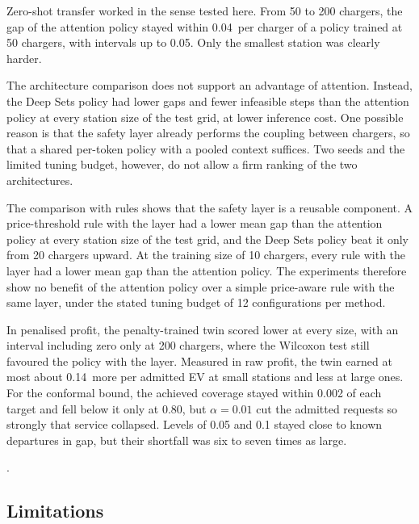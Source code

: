 Zero-shot transfer worked in the sense tested here.
From 50 to 200 chargers, the gap of the attention policy stayed within 0.04\,\texteuro{} per charger of a policy trained at 50 chargers, with intervals up to 0.05.
Only the smallest station was clearly harder.

The architecture comparison does not support an advantage of attention.
Instead, the Deep Sets policy had lower gaps and fewer infeasible steps than the attention policy at every station size of the test grid, at lower inference cost.
One possible reason is that the safety layer already performs the coupling between chargers, so that a shared per-token policy with a pooled context suffices.
Two seeds and the limited tuning budget, however, do not allow a firm ranking of the two architectures.

The comparison with rules shows that the safety layer is a reusable component.
A price-threshold rule with the layer had a lower mean gap than the attention policy at every station size of the test grid, and the Deep Sets policy beat it only from 20 chargers upward.
At the training size of 10 chargers, every rule with the layer had a lower mean gap than the attention policy.
The experiments therefore show no benefit of the attention policy over a simple price-aware rule with the same layer, under the stated tuning budget of 12 configurations per method.

In penalised profit, the penalty-trained twin scored lower at every size, with an interval including zero only at 200 chargers, where the Wilcoxon test still favoured the policy with the layer.
Measured in raw profit, the twin earned at most about 0.14\,\texteuro{} more per admitted EV at small stations and less at large ones.
For the conformal bound, the achieved coverage stayed within 0.002 of each target and fell below it only at 0.80, but $\alpha=0.01$ cut the admitted requests so strongly that service collapsed.
Levels of 0.05 and 0.1 stayed close to known departures in gap, but their shortfall was six to seven times as large.

.

\subsection{Limitations}\label{sec:limitations}

